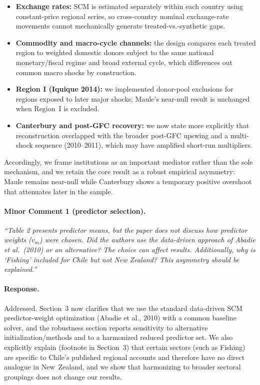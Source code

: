 \begin{itemize}
  \item \textbf{Exchange rates:} SCM is estimated separately within each country using constant-price regional series, so cross-country nominal exchange-rate movements cannot mechanically generate treated-vs.-synthetic gaps.
  \item \textbf{Commodity and macro-cycle channels:} the design compares each treated region to weighted domestic donors subject to the same national monetary/fiscal regime and broad external cycle, which differences out common macro shocks by construction.
  \item \textbf{Region I (Iquique 2014):} we implemented donor-pool exclusions for regions exposed to later major shocks; Maule's near-null result is unchanged when Region~I is excluded.
  \item \textbf{Canterbury and post-GFC recovery:} we now state more explicitly that reconstruction overlapped with the broader post-GFC upswing and a multi-shock sequence (2010--2011), which may have amplified short-run multipliers.
\end{itemize}

Accordingly, we frame institutions as an important mediator rather than the sole mechanism, and we retain the core result as a robust empirical asymmetry: Maule remains near-null while Canterbury shows a temporary positive overshoot that attenuates later in the sample.

\paragraph{Minor Comment 1 (predictor selection).}
\textit{``Table 2 presents predictor means, but the paper does not discuss how predictor weights ($v_m$) were chosen. Did the authors use the data-driven approach of Abadie et al.\ (2010) or an alternative? The choice can affect results. Additionally, why is `Fishing' included for Chile but not New Zealand? This asymmetry should be explained.''}

\paragraph{Response.}
Addressed. Section~3 now clarifies that we use the standard data-driven SCM predictor-weight optimization (Abadie et al., 2010) with a common baseline solver, and the robustness section reports sensitivity to alternative initialization/methods and to a harmonized reduced predictor set. We also explicitly explain (footnote in Section~3) that certain sectors (such as Fishing) are specific to Chile's published regional accounts and therefore have no direct analogue in New~Zealand, and we show that harmonizing to broader sectoral groupings does not change our results.

